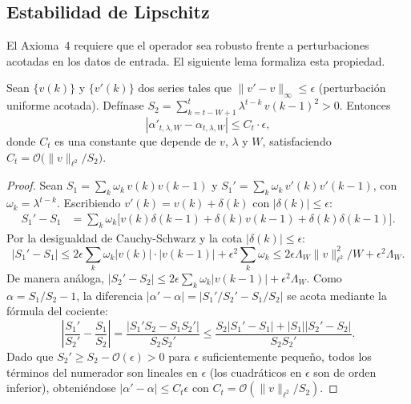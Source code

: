 \subsection{Estabilidad de Lipschitz}
\label{subsec:teorema_estabilidad}

El Axioma~4 requiere que el operador sea robusto frente a
perturbaciones acotadas en los datos de entrada.  El siguiente lema
formaliza esta propiedad.

\begin{lemma}
\label{lem:estabilidad_general}
Sean $\{v(k)\}$ y $\{v'(k)\}$ dos series tales que
$\|v' - v\|_\infty \leq \epsilon$ (perturbación uniforme acotada).
Defínase
$S_2 = \sum_{k=t-W+1}^{t} \lambda^{t-k}\, v(k-1)^2 > 0$.
Entonces
\[
|\alpha'_{t,\lambda,W} - \alpha_{t,\lambda,W}|
\leq C_t \cdot \epsilon,
\]
donde $C_t$ es una constante que depende de $v$, $\lambda$ y $W$,
satisfaciendo
$C_t = \mathcal{O}\!\bigl(\|v\|_{\ell^2} / S_2\bigr)$.
\end{lemma}

\begin{proof}
Sean $S_1 = \sum_k \omega_k\, v(k)v(k-1)$ y
$S_1' = \sum_k \omega_k\, v'(k)v'(k-1)$, con
$\omega_k = \lambda^{t-k}$.  Escribiendo $v'(k) = v(k) + \delta(k)$
con $|\delta(k)| \leq \epsilon$:
\begin{align*}
S_1' - S_1 &= \sum_k \omega_k\bigl[
  v(k)\delta(k-1) + \delta(k)v(k-1) + \delta(k)\delta(k-1)
\bigr].
\end{align*}
Por la desigualdad de Cauchy-Schwarz y la cota
$|\delta(k)| \leq \epsilon$:
\[
|S_1' - S_1| \leq 2\epsilon \sum_k \omega_k |v(k)| \cdot |v(k-1)|
+ \epsilon^2 \sum_k \omega_k
\leq 2\epsilon \Lambda_W \|v\|_{\ell^2}^2 / W + \epsilon^2 \Lambda_W.
\]
De manera análoga, $|S_2' - S_2| \leq
2\epsilon\sum_k \omega_k |v(k-1)| + \epsilon^2 \Lambda_W$.
Como $\alpha = S_1/S_2 - 1$, la diferencia
$|\alpha' - \alpha| = |S_1'/S_2' - S_1/S_2|$ se acota
mediante la fórmula del cociente:
\[
\left|\frac{S_1'}{S_2'} - \frac{S_1}{S_2}\right|
= \frac{|S_1' S_2 - S_1 S_2'|}{S_2 S_2'}
\leq \frac{S_2|S_1'-S_1| + |S_1||S_2'-S_2|}{S_2 S_2'}.
\]
Dado que $S_2' \geq S_2 - \mathcal{O}(\epsilon) > 0$ para
$\epsilon$ suficientemente pequeño, todos los términos del
numerador son lineales en $\epsilon$ (los cuadráticos en $\epsilon$
son de orden inferior), obteniéndose $|\alpha' - \alpha|
\leq C_t \epsilon$ con
$C_t = \mathcal{O}(\|v\|_{\ell^2} / S_2)$.
\end{proof}

